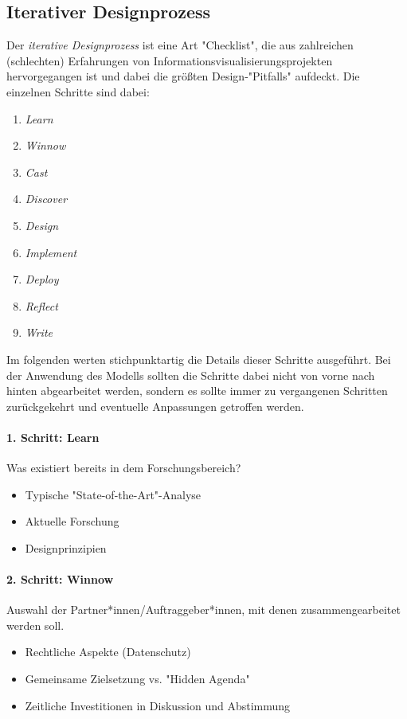 		\subsection{Iterativer Designprozess}
			Der \emph{iterative Designprozess} ist eine Art "Checklist", die aus zahlreichen (schlechten) Erfahrungen von Informationsvisualisierungsprojekten hervorgegangen ist und dabei die größten Design-"Pitfalls" aufdeckt. Die einzelnen Schritte sind dabei:
			\begin{enumerate}
				\item \emph{Learn}
				\item \emph{Winnow}
				\item \emph{Cast}
				\item \emph{Discover}
				\item \emph{Design}
				\item \emph{Implement}
				\item \emph{Deploy}
				\item \emph{Reflect}
				\item \emph{Write}
			\end{enumerate}
			Im folgenden werten stichpunktartig die Details dieser Schritte ausgeführt. Bei der Anwendung des Modells sollten die Schritte dabei nicht von vorne nach hinten abgearbeitet werden, sondern es sollte immer zu vergangenen Schritten zurückgekehrt und eventuelle Anpassungen getroffen werden.

			\paragraph{1. Schritt: Learn}
			Was existiert bereits in dem Forschungsbereich?
			\begin{itemize}
				\item Typische "State-of-the-Art"-Analyse
				\item Aktuelle Forschung
				\item Designprinzipien
			\end{itemize}

			\paragraph{2. Schritt: Winnow}
			Auswahl der Partner*innen/Auftraggeber*innen, mit denen zusammengearbeitet werden soll.
			\begin{itemize}
				\item Rechtliche Aspekte (Datenschutz)
				\item Gemeinsame Zielsetzung vs. "Hidden Agenda"
				\item Zeitliche Investitionen in Diskussion und Abstimmung
			\end{itemize}

